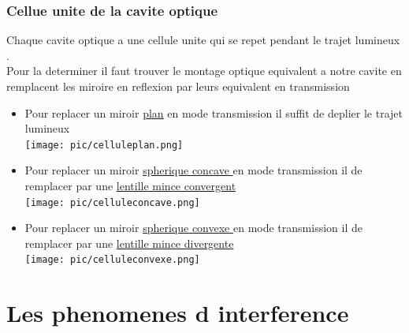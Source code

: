 \documentclass[12pt]{book}
\begin{document}
        \subsection{Cellue unite de la cavite optique}
        Chaque cavite optique a une cellule unite qui se repet pendant le trajet lumineux .\\
        Pour la determiner il faut trouver le montage optique equivalent a notre cavite en remplacent les miroire en reflexion par leurs equivalent en transmission
        \begin{itemize}
            \item Pour replacer un miroir \underline{plan} en mode transmission il suffit de deplier le trajet lumineux
               \\ \texttt{[image: pic/celluleplan.png]}
            \item Pour replacer un miroir \underline{spherique concave } en mode transmission il de remplacer par une \underline{lentille mince convergent}
              \\  \texttt{[image: pic/celluleconcave.png]}
            \item Pour replacer un miroir \underline{spherique convexe } en mode transmission il de remplacer par une \underline{lentille mince divergente}
               \\ \texttt{[image: pic/celluleconvexe.png]}
        \end{itemize}
    \chapter{Les phenomenes d interference}
\end{document}

